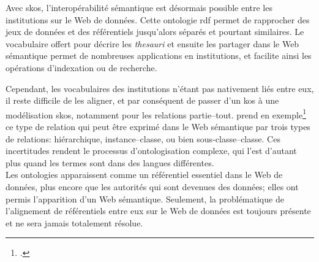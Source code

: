 Avec \ac{skos}, l'interopérabilité sémantique est désormais possible entre les institutions sur le Web de données. Cette ontologie \ac{rdf} permet de rapprocher des jeux de données et des référentiels jusqu'alors séparés et pourtant similaires. Le vocabulaire offert pour décrire les \textit{thesauri} et ensuite les partager dans le Web sémantique permet de nombreuses applications en institutions, et facilite ainsi les opérations d'indexation ou de recherche.

\bigskip
\bigskip
Cependant, les vocabulaires des institutions n'étant pas nativement liés entre eux, il reste difficile de les aligner, et par conséquent de passer d'un \ac{kos} à une modélisation \ac{skos}, notamment pour les relations partie--tout.  prend en exemple\footcite{dalbin_approches_2011} ce type de relation qui peut être exprimé dans le Web sémantique par trois types de relations: hiérarchique, instance--classe, ou bien sous-classe--classe. Ces incertitudes rendent le processus d'ontologisation complexe, qui l'est d'autant plus quand les termes sont dans des langues différentes.\\

Les ontologies apparaissent comme un référentiel essentiel dans le Web de données, plus encore que les autorités qui sont devenues des données; elles ont permis l'apparition d'un Web sémantique. Seulement, la problématique de l'alignement de référentiels entre eux sur le Web de données est toujours présente et ne sera jamais totalement résolue.